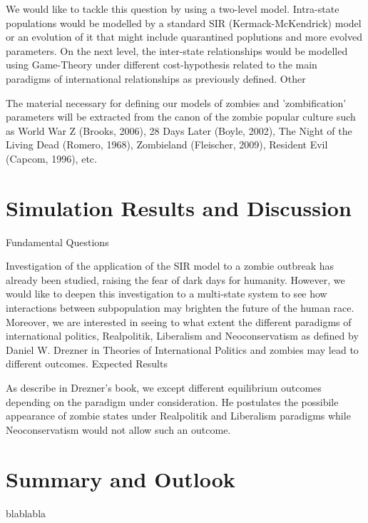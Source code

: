 \documentclass[11pt]{article}
\begin{document}
We would like to tackle this question by using a two-level model. Intra-state populations would be modelled by a standard SIR (Kermack-McKendrick) model or an evolution of it that might include quarantined poplutions and more evolved parameters. On the next level, the inter-state relationships would be modelled using Game-Theory under different cost-hypothesis related to the main paradigms of international relationships as previously defined.
Other

The material necessary for defining our models of zombies and 'zombification' parameters will be extracted from the canon of the zombie popular culture such as World War Z (Brooks, 2006), 28 Days Later (Boyle, 2002), The Night of the Living Dead (Romero, 1968), Zombieland (Fleischer, 2009), Resident Evil (Capcom, 1996), etc.

\section{Simulation Results and Discussion}\indent
Fundamental Questions

Investigation of the application of the SIR model to a zombie outbreak has already been studied, raising the fear of dark days for humanity. However, we would like to deepen this investigation to a multi-state system to see how interactions between subpopulation may brighten the future of the human race. Moreover, we are interested in seeing to what extent the different paradigms of international politics, Realpolitik, Liberalism and Neoconservatism as defined by Daniel W. Drezner in Theories of International Politics and zombies may lead to different outcomes.
Expected Results

As describe in Drezner's book, we except different equilibrium outcomes depending on the paradigm under consideration. He postulates the possibile appearance of zombie states under Realpolitik and Liberalism paradigms while Neoconservatism would not allow such an outcome.

\section{Summary and Outlook}\indent

blablabla\cite{reluga2009sis}


\nocite{bennett1995modelling, balcan2011phase, funk2010modelling, reluga2010game, reluga2009sis, munz2009zombies, drezner}
\end{document}
